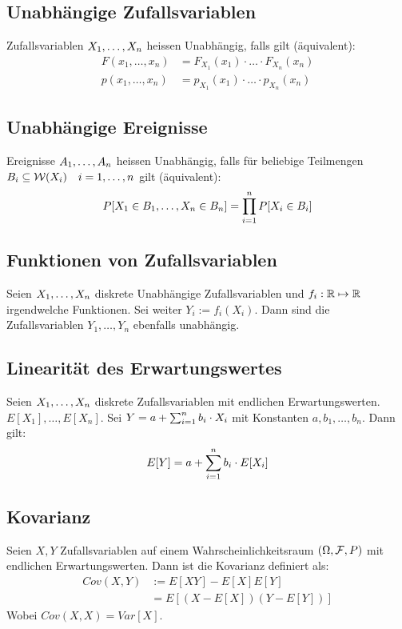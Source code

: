 \subsection{Unabhängige Zufallsvariablen}
Zufallsvariablen $X_1, \dots, X_n$ heissen Unabhängig, falls gilt
(äquivalent):
\begin{align*}
  F (x_1, \dots, x_n) & = F_{X_1} (x_1) \cdot \hdots \cdot F_{X_n} (x_n) \\
  p (x_1, \dots, x_n) & = p_{X_1} (x_1) \cdot \hdots \cdot p_{X_n} (x_n)
\end{align*}
\subsection{Unabhängige Ereignisse}
Ereignisse $A_1, \dots, A_n$ heissen Unabhängig, falls für beliebige Teilmengen
$B_i \subseteq \mathcal{W} (X_i) \quad i = 1, \dots, n$ gilt (äquivalent):
\begin{align*}
  P[X_1 \in B_1, \dots, X_n \in B_n] = \prod_{i = 1}^n P[X_i \in B_i]
\end{align*}
\subsection{Funktionen von Zufallsvariablen}
Seien $X_1, \dots, X_n$ diskrete Unabhängige Zufallsvariablen und $f_i: \mathbb{R}
  \mapsto \mathbb{R}$ irgendwelche Funktionen. Sei weiter $Y_i := f_i (X_i)$. Dann sind
die Zufallsvariablen $Y_1, \dots, Y_n$ ebenfalls unabhängig.
\subsection{Linearität des Erwartungswertes}
Seien $X_1, \dots, X_n$ diskrete Zufallsvariablen mit endlichen
Erwartungswerten. $E[X_1], \dots, E[X_n]$. Sei $Y = a + \sum_{i = 1}^n b_i \cdot X_i$ mit
Konstanten $a, b_1, \dots, b_n$. Dann gilt:
\begin{align*}
  E[Y] = a + \sum_{i = 1}^n b_i \cdot E[X_i]
\end{align*}
\subsection{Kovarianz}
Seien $X, Y$ Zufallsvariablen auf einem Wahrscheinlichkeitsraum $ (\Omega, \mathcal{F},
  P)$ mit endlichen Erwartungswerten. Dann ist die Kovarianz definiert als:
\begin{align*}
  Cov (X, Y) & := E[XY] - E[X]E[Y]          \\
             & = E[ (X - E[X])  (Y - E[Y])]
\end{align*}
Wobei $Cov (X, X) = Var[X]$.

